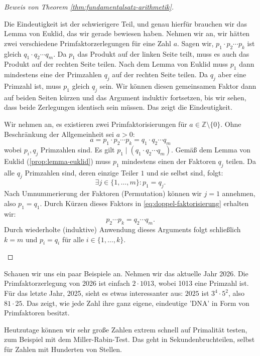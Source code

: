 \begin{proof}[Beweis von Theorem \ref{thm:fundamentalsatz-arithmetik}]
\begin{spoken-clean}[00:50:00 - 00:53:30]
Die Eindeutigkeit ist der schwierigere Teil, und genau hierfür brauchen wir das Lemma von Euklid, das wir gerade bewiesen haben. Nehmen wir an, wir hätten zwei verschiedene Primfaktorzerlegungen für eine Zahl $a$. Sagen wir, $p_1 \cdot p_2 \cdots p_k$ ist gleich $q_1 \cdot q_2 \cdots q_m$. Da $p_1$ das Produkt auf der linken Seite teilt, muss es auch das Produkt auf der rechten Seite teilen. Nach dem Lemma von Euklid muss $p_1$ dann mindestens eine der Primzahlen $q_j$ auf der rechten Seite teilen. Da $q_j$ aber eine Primzahl ist, muss $p_1$ gleich $q_j$ sein. Wir können diesen gemeinsamen Faktor dann auf beiden Seiten kürzen und das Argument induktiv fortsetzen, bis wir sehen, dass beide Zerlegungen identisch sein müssen. Das zeigt die Eindeutigkeit.
\end{spoken-clean}

\begin{math-stroke}
\begin{short-proof}
Wir nehmen an, es existieren zwei Primfaktorisierungen für $a \in \mathbb{Z} \setminus \{0\}$. Ohne Beschränkung der Allgemeinheit sei $a > 0$:
\begin{equation}\label{eq:doppel-faktorisierung}
a = p_1 \cdot p_2 \cdots p_k = q_1 \cdot q_2 \cdots q_m
\end{equation}
wobei $p_i, q_j$ Primzahlen sind. Es gilt $p_1 \mid (q_1 \cdot q_2 \cdots q_m)$. Gemäß dem Lemma von Euklid (\cref{prop:lemma-euklid}) muss $p_1$ mindestens einen der Faktoren $q_j$ teilen. Da alle $q_j$ Primzahlen sind, deren einzige Teiler $1$ und sie selbst sind, folgt:
\[
\exists j \in \{1, \dots, m\} \colon p_1 = q_j.
\]
Nach Umnummerierung der Faktoren (Permutation) können wir $j=1$ annehmen, also $p_1 = q_1$. Durch Kürzen dieses Faktors in \eqref{eq:doppel-faktorisierung} erhalten wir:
\[
p_2 \cdots p_k = q_2 \cdots q_m.
\]
Durch wiederholte (induktive) Anwendung dieses Arguments folgt schließlich $k = m$ und $p_i = q_i$ für alle $i \in \{1, \dots, k\}$.
\end{short-proof}
\end{math-stroke}
\end{proof}

\begin{spoken-clean}[00:53:30 - 00:57:00]
Schauen wir uns ein paar Beispiele an. Nehmen wir das aktuelle Jahr 2026. Die Primfaktorzerlegung von 2026 ist einfach $2 \cdot 1013$, wobei 1013 eine Primzahl ist. Für das letzte Jahr, 2025, sieht es etwas interessanter aus: $2025$ ist $3^4 \cdot 5^2$, also $81 \cdot 25$. Das zeigt, wie jede Zahl ihre ganz eigene, eindeutige 'DNA' in Form von Primfaktoren besitzt.

Heutzutage können wir sehr große Zahlen extrem schnell auf Primalität testen, zum Beispiel mit dem Miller-Rabin-Test. Das geht in Sekundenbruchteilen, selbst für Zahlen mit Hunderten von Stellen.
\end{spoken-clean}

